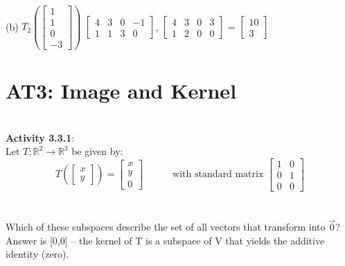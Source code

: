\documentclass{article}
\begin{document}
\\
(b) $T_{2} \left( \left[ \begin{matrix} 
1\\1\\0\\-3 
\end{matrix} \right] \right)$ 
$\left[\begin{matrix}
4 & 3 & 0 & -1 \\1 & 1 & 3 & 0
\end{matrix}\right]$, 
$\left[\begin{matrix}
4 & 3 & 0 & 3 \\1 & 2 & 0 & 0 
\end{matrix}\right]$ = 
$\left[\begin{matrix}
10 \\3
\end{matrix}\right]$
\newpage
\section{AT3: Image and Kernel}\\
\noindent \textbf{Activity 3.3.1}:\\
Let $T: \mathbb{R}^2 \to \mathbb{R}^3$ be given by:\\
\begin{equation*}
T\left(\left[\begin{array}{c}x \\ y \end{array}\right] \right)
=
\left[\begin{array}{c} x \\ y \\ 0 \end{array}\right]
\hspace{3em}
\text{with standard matrix }
\left[\begin{array}{cc} 1 & 0 \\ 0 & 1 \\ 0 & 0 \end{array}\right]
\end{equation*}
\\
\\
Which of these subspaces describe the set of all vectors that transform into $\vec{0}$?
Answer is [0,0] -- the kernel of T is a subspace of V that yields the additive identity (zero).\\
\end{document}
